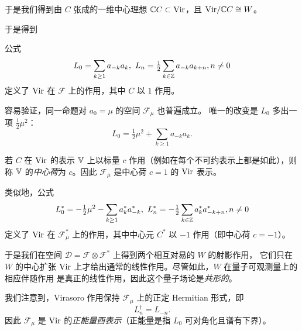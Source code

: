 
于是我们得到由 $C$ 张成的一维中心理想 $\Bbb CC\subset {\rm Vir}$，且
${\rm Vir}/\Bbb CC\cong W$。

于是得到

\begin{theorem} 公式
$$
L_0=\sum_{k\ge 1}a_{-k}a_k,\ L_n=\tfrac{1}{2}\sum_{k\in \Bbb Z}a_{-k}a_{k+n},n\ne 0
$$
定义了 ${\rm Vir}$ 在 $\mathcal F$ 上的作用，其中 $C$ 以 $1$ 作用。
\end{theorem} 

容易验证，同一命题对 $a_0=\mu$ 的空间 $\mathcal F_\mu$ 也普遍成立。
唯一的改变是 $L_0$ 多出一项 $\tfrac{1}{2}\mu^2$：
$$
L_0=\tfrac{1}{2}\mu^2+\sum_{k\ge 1}a_{-k}a_k. 
$$

若 $C$ 在 ${\rm Vir}$ 的表示 $\Bbb V$ 上以标量 $c$ 作用（例如在每个不可约表示上都是如此），则称 $\Bbb V$ 的\emph{中心荷}为 $c$。因此 $\mathcal F_\mu$
是中心荷 $c=1$ 的 ${\rm Vir}$ 表示。

类似地，公式
$$
L_0^*=-\tfrac{1}{2}\mu^2-\sum_{k\ge 1}a_{k}^*a_{-k}^*,\ L_n^*=-\tfrac{1}{2}\sum_{k\in \Bbb Z}a_{k}^*a_{-k+n}^*,n\ne 0
$$
定义了 ${\rm Vir}$ 在 $\mathcal F_\mu^*$ 上的作用，其中中心元 $C^*$ 以 $-1$ 作用（即中心荷 $c=-1$）。

于是我们在空间 $\mathcal D=\mathcal F\otimes \mathcal F^*$ 上得到两个相互对易的 $W$ 的射影作用，
它们只在 $W$ 的中心扩张 ${\rm Vir}$ 上才给出通常的线性作用。尽管如此，$W$ 在量子可观测量上的相应伴随作用
是真正的线性作用，因此这个量子场论是\emph{共形的}。

我们注意到，Virasoro 作用保持 $\mathcal F_\mu$ 上的正定 Hermitian 形式，即
$$
L_n^\dagger=L_{-n}.
$$
因此 $\mathcal F_\mu$ 是 ${\rm Vir}$ 的\emph{正能量酉表示}（正能量是指
$L_0$ 可对角化且谱有下界）。

